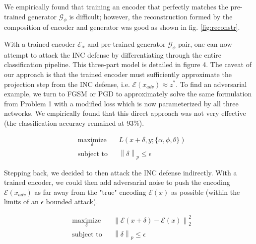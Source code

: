 \documentclass{article}
\theoremstyle{definition}
\newcommand{\norm}[2]{\left\lVert #1 \right\rVert_{#2}}
\begin{document}
We empirically found that training an encoder that perfectly matches the pre-trained generator $\mathcal{G}_{\phi}$ is difficult; however, the reconstruction formed by the composition of encoder and generator was good as shown in fig. \ref{fig:reconstr}.

With a trained encoder $\mathcal{E}_{\alpha}$ and pre-trained generator $\mathcal{G}_{\phi}$ pair, one can now attempt to attack the INC defense by differentiating through the entire classification pipeline. This three-part model is detailed in figure 4. The caveat of our approach is that the trained encoder must sufficiently approximate the projection step from the INC defense, i.e. $\mathcal{E}(x_{adv}) \approx z^*$. To find an adversarial example, we turn to FGSM or PGD to approximately solve the same formulation from Problem 1 with a modified loss which is now parameterized by all three networks. We empirically found that this direct approach was not very effective (the classification accuracy remained at 93\%).

\begin{problem}
    \begin{equation*}
    \begin{aligned}
    & \underset{\delta}{\text{maximize}}
    & & L(x+\delta,y;\{\alpha,\phi,\theta\}) \\
    & \text{subject to}
    & & \norm{\delta}{p} \leq \epsilon
    \end{aligned}
    \end{equation*}
\end{problem}

Stepping back, we decided to then attack the INC defense indirectly. With a trained encoder, we could then add adversarial noise to push the encoding $\mathcal{E}(x_{adv})$ as far away from the "true" encoding $\mathcal{E}(x)$ as possible (within the limits of an $\epsilon$ bounded attack).

\begin{problem}
    \begin{equation*}
        \begin{aligned}
        & \underset{\delta}{\text{maximize}}
        & & \norm{\mathcal{E}(x+\delta)-\mathcal{E}(x)}{2}^2 \\
        & \text{subject to}
        & & \norm{\delta}{p} \leq \epsilon
        \end{aligned}
    \end{equation*}
\end{problem}
\end{document}
